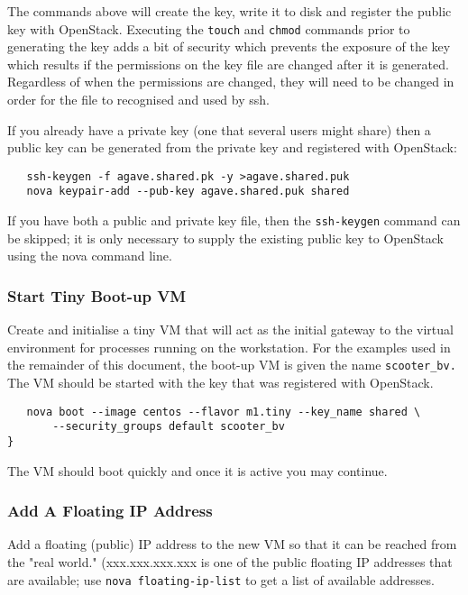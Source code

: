The commands above will create the key, write it to disk and register the public key with OpenStack.
Executing the \verb!touch! and \verb!chmod! commands prior to generating the key adds a bit of security which prevents the exposure of the key 
which results if the permissions on the key file are changed after it is generated. 
Regardless of when the permissions are changed, they will need to be changed in order for the file to recognised and used by ssh.

If you already have a private key (one that several users might share) then a public key can be generated from the private key and registered with OpenStack:

\small\begin{verbatim}
   ssh-keygen -f agave.shared.pk -y >agave.shared.puk
   nova keypair-add --pub-key agave.shared.puk shared

\end{verbatim}\normalsize

If you have both a public and private key file, then the \verb!ssh-keygen! command can be skipped; it is only necessary to supply the existing public key to 
OpenStack using the nova command line. 

\subsubsection{Start Tiny Boot-up VM}
Create and initialise a tiny VM that will act as the initial gateway to the virtual environment for processes running on the workstation.
For the examples used in the remainder of this document, the boot-up VM is given the name \verb!scooter_bv.! 
The VM should be started with the key that was registered with OpenStack. 

\small\begin{verbatim}
   nova boot --image centos --flavor m1.tiny --key_name shared \
       --security_groups default scooter_bv
}
\end{verbatim}\normalsize

\noindent
The VM should boot quickly and once it is active you may continue.

\subsubsection{Add A Floating IP Address}
Add a floating (public) IP address to the new VM so that it can be reached from the "real world."
(xxx.xxx.xxx.xxx is one of the public floating IP addresses that are available; use \verb!nova floating-ip-list! 
to get a list of available addresses.

